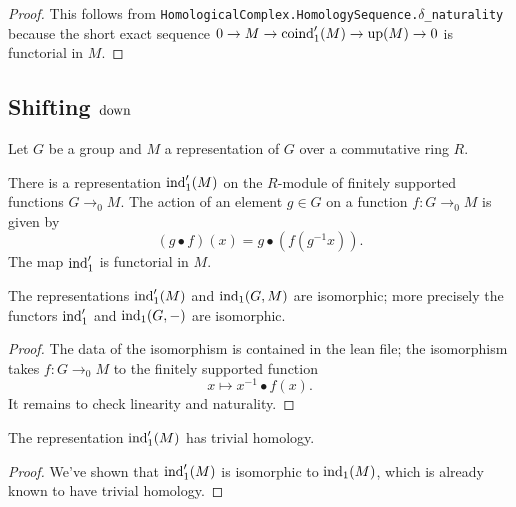 \begin{proof}
	This follows from \texttt{HomologicalComplex.HomologySequence.$\delta$\_naturality}
	because the short exact sequence $0 \to M \to \mathrm{coind}_1'(M) \to \mathrm{up}(M) \to 0$
	is functorial in $M$.
\end{proof}

\subsection{Shifting $\mathrm{down}$}
Let $G$ be a group and $M$ a representation of $G$ over a commutative ring $R$.

\begin{definition} \label{def:ind₁'}
	There is a representation $\mathrm{ind}_1' (M)$ on the $R$-module of finitely supported
	functions $G \to_0 M$.
	The action of an element $g \in G$ on a function $f : G \to_0 M$ is given by
	\[
		(g \bullet f)(x) = g \bullet (f (g^{-1}x)).
	\]
	The map $\mathrm{ind}_1'$ is functorial in $M$.
\end{definition}

\begin{lemma}	\label{lem:ind₁' iso ind₁}
	\leanok
	The representations $\mathrm{ind}_1'(M)$ and $\mathrm{ind}_1(G,M)$ are isomorphic; more precisely the
	functors $\mathrm{ind}_1'$ and $\mathrm{ind}_1(G,-)$ are isomorphic.
\end{lemma}

\begin{proof}
	The data of the isomorphism is contained in the lean file; the isomorphism
	takes $f : G \to_0 M$ to the finitely supported function
	\[
		x \mapsto x^{-1} \bullet f(x).
	\]
	It remains to check linearity and naturality.
\end{proof}

\begin{corollary}	\label{cor:ind₁' trivial homology}
	\leanok
	The representation $\mathrm{ind}_1'(M)$ has trivial homology.
\end{corollary}

\begin{proof}
	\leanok
	We've shown that $\mathrm{ind}_1'(M)$ is isomorphic to $\mathrm{ind}_1(M)$, which is already known to
	have trivial homology.
\end{proof}


